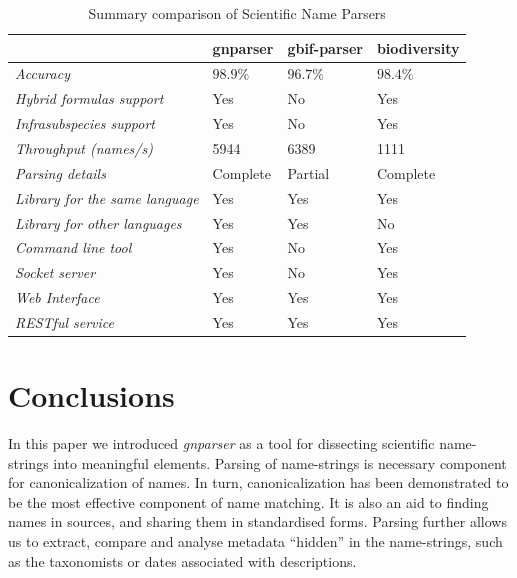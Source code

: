 \documentclass{bmcart}
\begin{document}
\begin{table}[htb]
  \begin{center}
    \caption{Summary comparison of Scientific Name Parsers}
    \label{table:summary}
    \resizebox{12.5cm}{!} {
    \begin{tabular}{|l|*{3}{l}|}
      \hline
                             & gnparser & gbif-parser & biodiversity \\
      \hline
      \textit{Accuracy}                     & $98.9\%$ & $96.7\%$ & $98.4\%$\\
      \textit{Hybrid formulas support}      & Yes      & No       & Yes     \\
      \textit{Infrasubspecies support}      & Yes      & No       & Yes     \\
      \textit{Throughput (names/s)}         & 5944     & 6389     & 1111    \\
      \textit{Parsing details}              & Complete & Partial  & Complete\\
      \textit{Library for the same language}& Yes      & Yes      & Yes     \\
      \textit{Library for other languages}  & Yes      & Yes      & No      \\
      \textit{Command line tool}            & Yes      & No       & Yes     \\
      \textit{Socket server}                & Yes      & No       & Yes     \\
      \textit{Web Interface}                & Yes      & Yes      & Yes     \\
      \textit{RESTful service}              & Yes      & Yes      & Yes     \\
      \hline
    \end{tabular}
  }
  \end{center}
\end{table}

\section*{Conclusions}

In this paper we introduced \textit{gnparser} as a tool for dissecting
scientific name-strings into meaningful elements. Parsing of name-strings is
necessary component for canonicalization of names. In turn, canonicalization
has been demonstrated to be the most effective component of name matching. It
is also an aid to finding names in sources, and sharing them in standardised
forms. Parsing further allows us to extract, compare and analyse metadata
``hidden'' in the name-strings, such as the taxonomists or dates associated
with descriptions.
\end{document}
